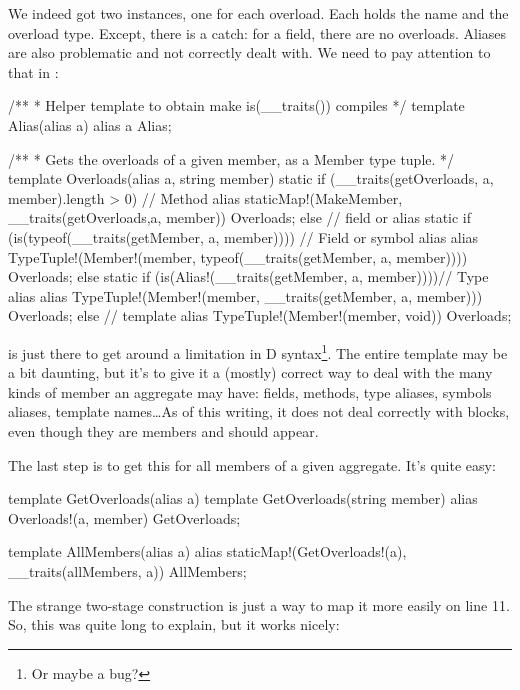 We indeed got two  instances, one for each overload. Each  holds the name  and the overload type. Except, there is a catch: for a field, there are no overloads. Aliases are also problematic and not correctly dealt with. We need to pay attention to that in :

\begin{dcode}
/**
 * Helper template to obtain make is(__traits()) compiles
 */
template Alias(alias a)
{
    alias a Alias;
}

/**
 * Gets the overloads of a given member, as a Member type tuple.
 */
template Overloads(alias a, string member)
{
    static if (__traits(getOverloads, a, member).length > 0) // Method
        alias staticMap!(MakeMember, __traits(getOverloads,a, member))
              Overloads;
    else // field or alias
        static if (is(typeof(__traits(getMember, a, member)))) // Field or symbol alias
            alias TypeTuple!(Member!(member, typeof(__traits(getMember, a, member)))) 
                  Overloads;
        else static if (is(Alias!(__traits(getMember, a, member))))// Type alias
            alias TypeTuple!(Member!(member, __traits(getMember, a, member)))
                  Overloads;
        else // template
            alias TypeTuple!(Member!(member, void))
                  Overloads;
}
\end{dcode}

 is just there to get around a limitation in D syntax\footnote{ Or maybe a bug?}. The entire template may be a bit daunting, but it's to give it a (mostly) correct way to deal with the many kinds of member an aggregate may have: fields, methods, type aliases, symbols aliases, template names\ldots As of this writing, it does not deal correctly with \DD{\{\}} blocks, even  though they are members and should appear.

The last step is to get this for all members of a given aggregate. It's quite easy:

\begin{dcode}
template GetOverloads(alias a)
{
    template GetOverloads(string member)
    {
        alias Overloads!(a, member) GetOverloads;
    }
}

template AllMembers(alias a)
{
    alias staticMap!(GetOverloads!(a), __traits(allMembers, a)) AllMembers; 
}
\end{dcode}

The strange  two-stage construction is just a way to map it more easily on line 11. So, this was quite long to explain, but it works nicely:

